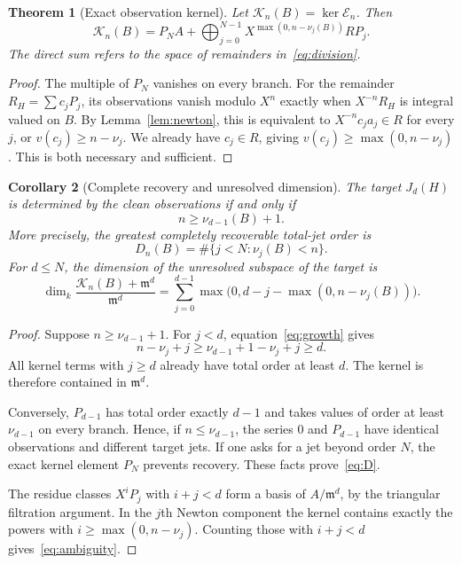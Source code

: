 \documentclass[11pt]{article}
\newtheorem{theorem}{Theorem}[section]
\newtheorem{corollary}[theorem]{Corollary}
\theoremstyle{definition}
\newcommand{\m}{\mathfrak m}
\newcommand{\Kern}{\mathcal K}
\newcommand{\E}{\mathcal E}
\begin{document}
\begin{theorem}[Exact observation kernel]\label{thm:kernel}
Let $\Kern_n(B)=\ker\E_n$. Then
\begin{equation}\label{eq:kernel}
 \boxed{\displaystyle
 \Kern_n(B)=P_NA+
 \bigoplus_{j=0}^{N-1}X^{\max(0,n-\nu_j(B))}R P_j.}
\end{equation}
The direct sum refers to the space of remainders in~\eqref{eq:division}.
\end{theorem}

\begin{proof}
The multiple of $P_N$ vanishes on every branch. For the remainder $R_H=\sum c_jP_j$, its observations vanish modulo $X^n$ exactly when $X^{-n}R_H$ is integral valued on $B$. By Lemma~\ref{lem:newton}, this is equivalent to $X^{-n}c_ja_j\in R$ for every $j$, or $v(c_j)\ge n-\nu_j$. We already have $c_j\in R$, giving $v(c_j)\ge\max(0,n-\nu_j)$. This is both necessary and sufficient.
\end{proof}

\begin{corollary}[Complete recovery and unresolved dimension]\label{cor:jet}
The target $J_d(H)$ is determined by the clean observations if and only if
\begin{equation}\label{eq:clean}
 \boxed{n\ge\nu_{d-1}(B)+1.}
\end{equation}
More precisely, the greatest completely recoverable total-jet order is
\begin{equation}\label{eq:D}
 D_n(B)=\#\{j<N:\nu_j(B)<n\}.
\end{equation}
For $d\le N$, the dimension of the unresolved subspace of the target is
\begin{equation}\label{eq:ambiguity}
 \dim_k\frac{\Kern_n(B)+\m^d}{\m^d}
 =\sum_{j=0}^{d-1}
 \max\bigl(0,d-j-\max(0,n-\nu_j(B))\bigr).
\end{equation}
\end{corollary}

\begin{proof}
Suppose $n\ge\nu_{d-1}+1$. For $j<d$, equation~\eqref{eq:growth} gives
\[
 n-\nu_j+j\ge\nu_{d-1}+1-\nu_j+j\ge d.
\]
All kernel terms with $j\ge d$ already have total order at least $d$. The kernel is therefore contained in $\m^d$.

Conversely, $P_{d-1}$ has total order exactly $d-1$ and takes values of order at least $\nu_{d-1}$ on every branch. Hence, if $n\le\nu_{d-1}$, the series $0$ and $P_{d-1}$ have identical observations and different target jets. If one asks for a jet beyond order $N$, the exact kernel element $P_N$ prevents recovery. These facts prove~\eqref{eq:D}.

The residue classes $X^iP_j$ with $i+j<d$ form a basis of $A/\m^d$, by the triangular filtration argument. In the $j$th Newton component the kernel contains exactly the powers with $i\ge\max(0,n-\nu_j)$. Counting those with $i+j<d$ gives~\eqref{eq:ambiguity}.
\end{proof}
\end{document}
